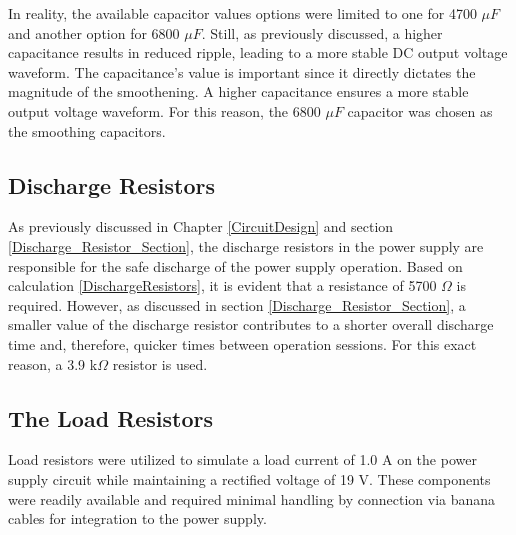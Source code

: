In reality, the available capacitor values options were limited to one for 4700 $\mu{F}$ and another option for 6800 $\mu{F}$. Still, as previously discussed, a higher capacitance results in reduced ripple, leading to a more stable DC output voltage waveform. The capacitance's value is important since it directly dictates the magnitude of the smoothening. A higher capacitance ensures a more stable output voltage waveform. For this reason, the 6800 $\mu{F}$ capacitor was chosen as the smoothing capacitors.

\subsection{Discharge Resistors}
As previously discussed in Chapter \ref{CircuitDesign} and section \ref{Discharge_Resistor_Section}, the discharge resistors in the power supply are responsible for the safe discharge of the power supply operation. Based on calculation \ref{DischargeResistors}, it is evident that a resistance of 5700 $\Omega$ is required. However, as discussed in section \ref{Discharge_Resistor_Section}, a smaller value of the discharge resistor contributes to a shorter overall discharge time and, therefore, quicker times between operation sessions. For this exact reason, a 3.9 k$\Omega$ resistor is used.

\subsection{The Load Resistors}
Load resistors were utilized to simulate a load current of 1.0 A on the power supply circuit while maintaining a rectified voltage of 19 V. These components were readily available and required minimal handling by connection via banana cables for integration to the power supply.

